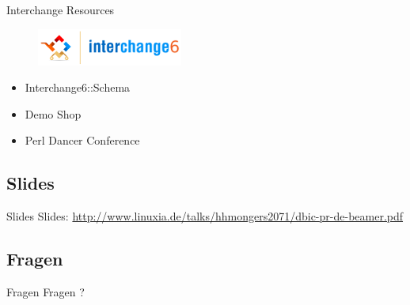 \begin{frame}{Interchange Resources}
\begin{figure}[!ht]
\centering
\includegraphics[width=0.4\linewidth]{img/interchange6-logo-v2.png}
\end{figure}
\begin{itemize}
\item Interchange6::Schema
\item Demo Shop
\item Perl Dancer Conference
\end{itemize}
\end{frame}

\subsection{Slides}

\begin{frame}{Slides}
Slides:
\url{http://www.linuxia.de/talks/hhmongers2071/dbic-pr-de-beamer.pdf}
\end{frame}

\subsection{Fragen}

\begin{frame}{Fragen}
\centering
Fragen ?
\end{frame}



